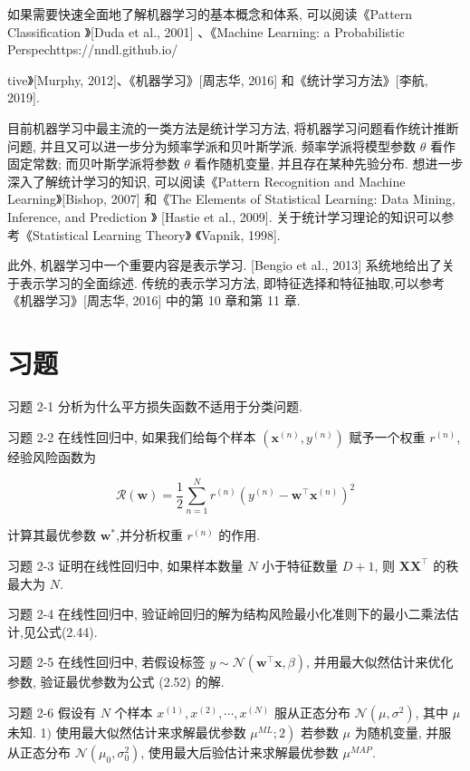 \documentclass[10pt]{article}
\begin{document}
如果需要快速全面地了解机器学习的基本概念和体系, 可以阅读《Pattern Classification 》[Duda et al., 2001] 、《Machine Learning: a Probabilistic Perspechttps://nndl.github.io/

tive》[Murphy, 2012]、《机器学习》[周志华, 2016] 和《统计学习方法》[李航, 2019].

目前机器学习中最主流的一类方法是统计学习方法, 将机器学习问题看作统计推断问题, 并且又可以进一步分为频率学派和贝叶斯学派. 频率学派将模型参数 $\theta$ 看作固定常数; 而贝叶斯学派将参数 $\theta$ 看作随机变量, 并且存在某种先验分布. 想进一步深入了解统计学习的知识, 可以阅读《Pattern Recognition and Machine Learning》[Bishop, 2007] 和《The Elements of Statistical Learning: Data Mining, Inference, and Prediction 》 [Hastie et al., 2009]. 关于统计学习理论的知识可以参考《Statistical Learning Theory》 《Vapnik, 1998].

此外, 机器学习中一个重要内容是表示学习. [Bengio et al., 2013] 系统地给出了关于表示学习的全面综述. 传统的表示学习方法, 即特征选择和特征抽取,可以参考《机器学习》[周志华, 2016] 中的第 10 章和第 11 章.

\section*{习题}
习题 2-1 分析为什么平方损失函数不适用于分类问题.

习题 2-2 在线性回归中, 如果我们给每个样本 $\left(\boldsymbol{x}^{(n)}, y^{(n)}\right)$ 赋予一个权重 $r^{(n)}$, 经验风险函数为


\begin{equation*}
\mathcal{R}(\boldsymbol{w})=\frac{1}{2} \sum_{n=1}^{N} r^{(n)}\left(y^{(n)}-\boldsymbol{w}^{\top} \boldsymbol{x}^{(n)}\right)^{2} \tag{2.91}
\end{equation*}


计算其最优参数 $\boldsymbol{w}^{*}$,并分析权重 $r^{(n)}$ 的作用.

习题 2-3 证明在线性回归中, 如果样本数量 $N$ 小于特征数量 $D+1$, 则 $\boldsymbol{X} \boldsymbol{X}^{\top}$ 的秩最大为 $N$.

习题 2-4 在线性回归中, 验证岭回归的解为结构风险最小化准则下的最小二乘法估计,见公式(2.44).

习题 2-5 在线性回归中, 若假设标签 $y \sim \mathcal{N}\left(\boldsymbol{w}^{\top} \boldsymbol{x}, \beta\right)$, 并用最大似然估计来优化参数, 验证最优参数为公式 (2.52) 的解.

习题 2-6 假设有 $N$ 个样本 $x^{(1)}, x^{(2)}, \cdots, x^{(N)}$ 服从正态分布 $\mathcal{N}\left(\mu, \sigma^{2}\right)$, 其中 $\mu$ 未知. 1$)$ 使用最大似然估计来求解最优参数 $\left.\mu^{M L} ; 2\right)$ 若参数 $\mu$ 为随机变量, 并服从正态分布 $\mathcal{N}\left(\mu_{0}, \sigma_{0}^{2}\right)$, 使用最大后验估计来求解最优参数 $\mu^{M A P}$.
\end{document}
